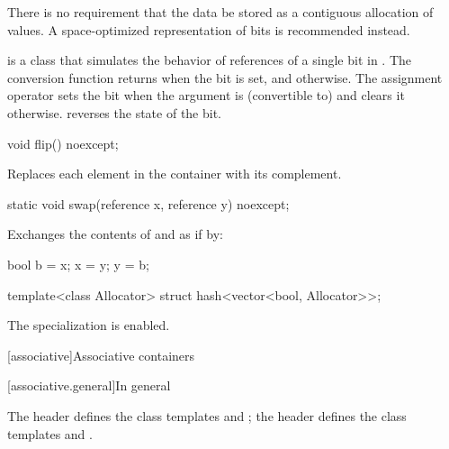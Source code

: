 \pnum
There is no requirement that the data be stored as a contiguous allocation
of  values. A space-optimized representation of bits is
recommended instead.

\pnum
{}
is a class that simulates the behavior of references of a single bit in
. The conversion function returns 
when the bit is set, and  otherwise. The assignment operator
sets the bit when the argument is (convertible to)  and
clears it otherwise.  reverses the state of the bit.

%
\begin{itemdecl}
void flip() noexcept;
\end{itemdecl}

\begin{itemdescr}
\pnum
\effects Replaces each element in the container with its complement.
\end{itemdescr}

%
\begin{itemdecl}
static void swap(reference x, reference y) noexcept;
\end{itemdecl}

\begin{itemdescr}
\pnum
\effects Exchanges the contents of  and  as if by:

\begin{codeblock}
bool b = x;
x = y;
y = b;
\end{codeblock}

\end{itemdescr}

\begin{itemdecl}
template<class Allocator> struct hash<vector<bool, Allocator>>;
\end{itemdecl}

\begin{itemdescr}
\pnum
The specialization is enabled.
\end{itemdescr}

[associative]{Associative containers}

[associative.general]{In general}

\pnum
The header  defines the class templates  and
; the header  defines the class templates
 and .

